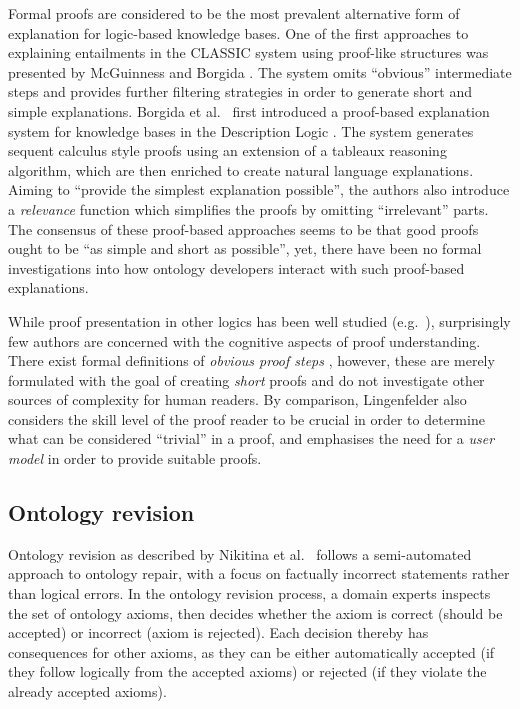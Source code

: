 Formal proofs are considered to be the most prevalent alternative form of explanation for logic-based knowledge bases. One of the first approaches to explaining entailments in the CLASSIC system using proof-like structures was presented by McGuinness and Borgida \cite{mcguinness95jb}. The system omits \enquote{obvious} intermediate steps and provides further filtering strategies in order to generate short and simple explanations. Borgida et al.\ \cite{borgida99cn} first introduced a proof-based explanation system for knowledge bases in the Description Logic . The system generates sequent calculus \cite{83aa} style proofs using an extension of a tableaux reasoning algorithm, which are then enriched to create natural language explanations. Aiming to \enquote{provide the simplest explanation possible}, the authors also introduce a \emph{relevance} function which simplifies the proofs by omitting \enquote{irrelevant} parts. The consensus of these proof-based approaches seems to be that good proofs ought to be \enquote{as simple and short as possible}, yet, there have been no formal investigations into how ontology developers interact with such proof-based explanations. 

While proof presentation in other logics has been well studied (e.g.\ \cite{felty1988aa}), surprisingly few authors are concerned with the cognitive aspects of proof understanding. There exist formal definitions of \emph{obvious proof steps} \cite{davis81sz, rudnicki87om}, however, these are merely formulated with the goal of creating \emph{short} proofs and do not investigate other sources of complexity for human readers. By comparison, Lingenfelder \cite{lingenfelder89rm} also considers the skill level of the proof reader to be crucial in order to determine what can be considered \enquote{trivial} in a proof, and emphasises the need for a \emph{user model} in order to provide suitable proofs. 

\subsection{Ontology revision}

Ontology revision as described by Nikitina et al.\ \cite{nikitina12aa} follows a semi-automated approach to ontology repair, with a focus on factually incorrect statements rather than logical errors. In the ontology revision process, a domain experts inspects the set of ontology axioms, then decides whether the axiom is correct (should be accepted) or incorrect (axiom is rejected). Each decision thereby has consequences for other axioms, as they can be either automatically accepted (if they follow logically from the accepted axioms) or rejected (if they violate the already accepted axioms). 

